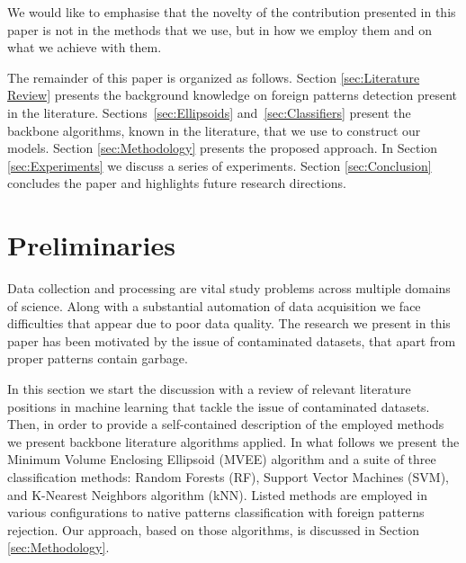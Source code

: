 \documentclass{llncs}
\begin{document}
We would like to emphasise that the novelty of the contribution presented in this paper is not in the methods that we use, but in how we employ them and on what we achieve with them.  %

The remainder of this paper is organized as follows. Section \ref{sec:Literature Review} presents the background knowledge on foreign patterns detection present in the literature. Sections~\ref{sec:Ellipsoids} and~\ref{sec:Classifiers} present the backbone algorithms, known in the literature, that we use to construct our models. Section \ref{sec:Methodology} presents the proposed approach. In Section \ref{sec:Experiments} we discuss a series of experiments. %
Section \ref{sec:Conclusion} concludes the paper and highlights future research directions.


\vspace{-3pt}
\section{Preliminaries}
  \label{sec:Preliminaries}
\vspace{-6pt}

Data collection and processing are vital study problems across multiple domains of science. Along with a substantial automation of data acquisition we face difficulties that appear due to poor data quality. The research we present in this paper has been motivated by the issue of contaminated datasets, that apart from proper patterns contain garbage.

In this section we start the discussion with a review of relevant literature positions in machine learning that tackle the issue of contaminated datasets. Then, in order to provide a self-contained description of the employed methods we present backbone literature algorithms applied. In what follows we present the Minimum Volume Enclosing Ellipsoid (MVEE) algorithm and a suite of three classification methods: Random Forests (RF), Support Vector Machines (SVM), and K-Nearest Neighbors algorithm (kNN). Listed methods are employed in various configurations to native patterns classification with foreign patterns rejection. Our approach, based on those algorithms, is discussed in Section \ref{sec:Methodology}.
\end{document}
